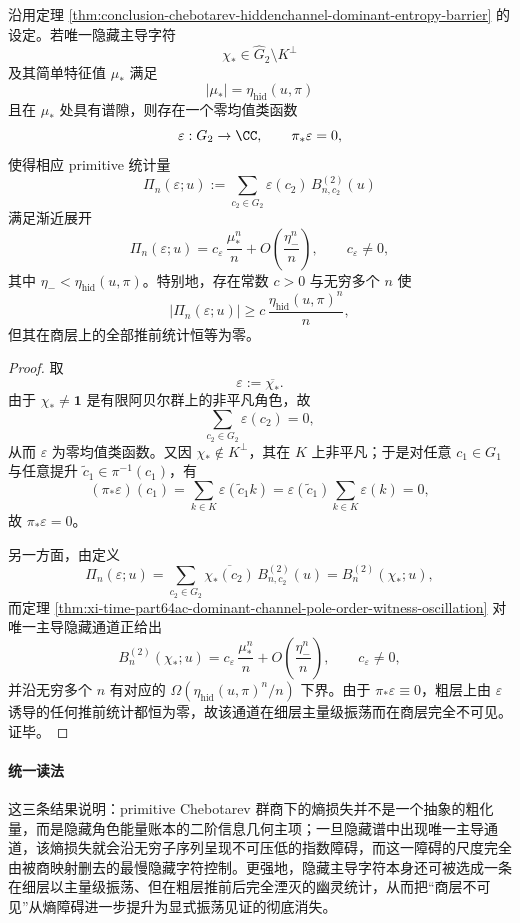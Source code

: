 \begin{theorem}\label{thm:conclusion-hidden-artin-ghost-oscillation}
沿用定理 \ref{thm:conclusion-chebotarev-hiddenchannel-dominant-entropy-barrier} 的设定。若唯一隐藏主导字符
\[
\chi_\ast\in \widehat G_2\setminus K^\perp
\]
及其简单特征值 \(\mu_\ast\) 满足
\[
|\mu_\ast|=\eta_{\mathrm{hid}}(u,\pi)
\]
且在 \(\mu_\ast\) 处具有谱隙，则存在一个零均值类函数
\[
\varepsilon:G_2\to \CC,
\qquad
\pi_\ast\varepsilon=0,
\]
使得相应 primitive 统计量
\[
\Pi_n(\varepsilon;u)
:=
\sum_{c_2\in G_2}\varepsilon(c_2)\,B_{n,c_2}^{(2)}(u)
\]
满足渐近展开
\[
\Pi_n(\varepsilon;u)
=
c_\varepsilon\,\frac{\mu_\ast^n}{n}
+
O\!\left(\frac{\eta_-^n}{n}\right),
\qquad
c_\varepsilon\neq 0,
\]
其中 \(\eta_-<\eta_{\mathrm{hid}}(u,\pi)\)。特别地，存在常数 \(c>0\) 与无穷多个 \(n\) 使
\[
|\Pi_n(\varepsilon;u)|
\ge
c\,\frac{\eta_{\mathrm{hid}}(u,\pi)^n}{n},
\]
但其在商层上的全部推前统计恒等为零。
\end{theorem}
\begin{proof}
取
\[
\varepsilon:=\overline{\chi_\ast}.
\]
由于 \(\chi_\ast\neq \mathbf 1\) 是有限阿贝尔群上的非平凡角色，故
\[
\sum_{c_2\in G_2}\varepsilon(c_2)=0,
\]
从而 \(\varepsilon\) 为零均值类函数。又因 \(\chi_\ast\notin K^\perp\)，其在 \(K\) 上非平凡；于是对任意 \(c_1\in G_1\) 与任意提升 \(\widetilde c_1\in \pi^{-1}(c_1)\)，有
\[
(\pi_\ast\varepsilon)(c_1)
=
\sum_{k\in K}\varepsilon(\widetilde c_1k)
=
\varepsilon(\widetilde c_1)\sum_{k\in K}\varepsilon(k)
=
0,
\]
故 \(\pi_\ast\varepsilon=0\)。

另一方面，由定义
\[
\Pi_n(\varepsilon;u)
=
\sum_{c_2\in G_2}\overline{\chi_\ast(c_2)}\,B_{n,c_2}^{(2)}(u)
=
B_n^{(2)}(\chi_\ast;u),
\]
而定理 \ref{thm:xi-time-part64ac-dominant-channel-pole-order-witness-oscillation} 对唯一主导隐藏通道正给出
\[
B_n^{(2)}(\chi_\ast;u)
=
c_\varepsilon\,\frac{\mu_\ast^n}{n}
+
O\!\left(\frac{\eta_-^n}{n}\right),
\qquad
c_\varepsilon\neq 0,
\]
并沿无穷多个 \(n\) 有对应的 \(\Omega(\eta_{\mathrm{hid}}(u,\pi)^n/n)\) 下界。由于 \(\pi_\ast\varepsilon\equiv 0\)，粗层上由 \(\varepsilon\) 诱导的任何推前统计都恒为零，故该通道在细层主量级振荡而在商层完全不可见。证毕。
\end{proof}

\paragraph{统一读法}
这三条结果说明：primitive Chebotarev 群商下的熵损失并不是一个抽象的粗化量，而是隐藏角色能量账本的二阶信息几何主项；一旦隐藏谱中出现唯一主导通道，该熵损失就会沿无穷子序列呈现不可压低的指数障碍，而这一障碍的尺度完全由被商映射删去的最慢隐藏字符控制。更强地，隐藏主导字符本身还可被选成一条在细层以主量级振荡、但在粗层推前后完全湮灭的幽灵统计，从而把“商层不可见”从熵障碍进一步提升为显式振荡见证的彻底消失。

\endinput
